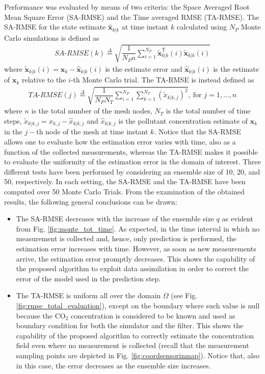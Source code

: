 \documentclass[journal]{IEEEtran}
\newcommand{\mb}{\mathbf}
\begin{document}
Performance was evaluated by means of two criteria: the Space Averaged Root Mean Square Error (SA-RMSE) and the Time averaged RMSE (TA-RMSE).
The SA-RMSE for the state estimate $\hat{\mb{x}}_{k|k}$ at time instant $k$ calculated using $N_{P}$ Monte Carlo simulations is defined as
\begin{align} \label{eq:rmse_time}
SA\mbox{-}RMSE(k) \overset{\Delta}{=} \sqrt{\dfrac{1}{N_Pn}\sum_{i=1}^{N_P}\tilde{\mb{x}}_{k|k}^{\mathrm{T}}(i)\tilde{\mb{x}}_{k|k}(i)}
\end{align}
where $\tilde{\mb{x}}_{k|k}(i) = \mb{x}_{k} - \hat{\mb{x}}_{k|k}(i)$  is the estimate error and $\hat{\mb{x}}_{k|k}(i)$ is the estimate of $\mb{x}_{k}$ relative to the $i$-th Monte Carlo trial. 
The TA-RMSE is instead defined as 
\begin{align} \label{eq:rmse_space}
TA\mbox{-}RMSE(j) \overset{\Delta}{=} \sqrt{\dfrac{1}{N_PN_T}\sum_{i=1}^{N_P} \sum_{k=1}^{N_T}(\tilde{x}_{k|k,j})^2}, \ \text{for } j=1,\dots,n%
\end{align}
where $n$ is the total number of the mesh nodes, $N_T$ is the total number of time steps, $\tilde{x}_{k|k,j} = {x}_{k,j} - \hat{x}_{k|k,j}$ and $\hat{x}_{k|k,j}$ is the pollutant concentration estimate of $\mb{x}_{k}$ in the $j-$th node of the mesh at time instant $k$.
Notice that the SA-RMSE allows one to evaluate how the estimation error varies with time, also as a function of the collected measurements, whereas the TA-RMSE makes it possible
to evaluate the uniformity of the estimation error in the domain of interest.
Three different tests have been performed by considering an ensemble size of 10, 20, and 50, respectively. In each setting, the SA-RMSE and the TA-RMSE have been computed over 50 Monte Carlo
Trials.
From the examination of the obtained results, the following general conclusions can be drawn:
\begin{itemize}
\item The SA-RMSE decreases with the increase of the ensemble size $q$ as evident from Fig. \ref{fig:monte_tot_time}. As expected, in the time interval in which no measurement is collected
and, hence, only prediction is performed, the estimation error increases with time. However, as soon as new measurements arrive, the estimation error promptly decreases. This shows the
capability of the proposed algorithm to exploit data assimilation in order to correct the error of the model used in the prediction step.
\item The TA-RMSE is uniform all over the domain $\Omega$ (see Fig. \ref{fig:rmse_total_evaluation}), except on the boundary where such value is null because the CO$_2$ concentration is considered to be known
and used as boundary condition for both the simulator and the filter. This shows the capability of the proposed algorithm to correctly estimate the concentration field even where no measurement is collected
(recall that the measurement sampling points are depicted in Fig. \ref{fig:coordsensorinmap}). Notice that, also in this case, the error decreases as the ensemble size increases.
\end{itemize}
\end{document}
